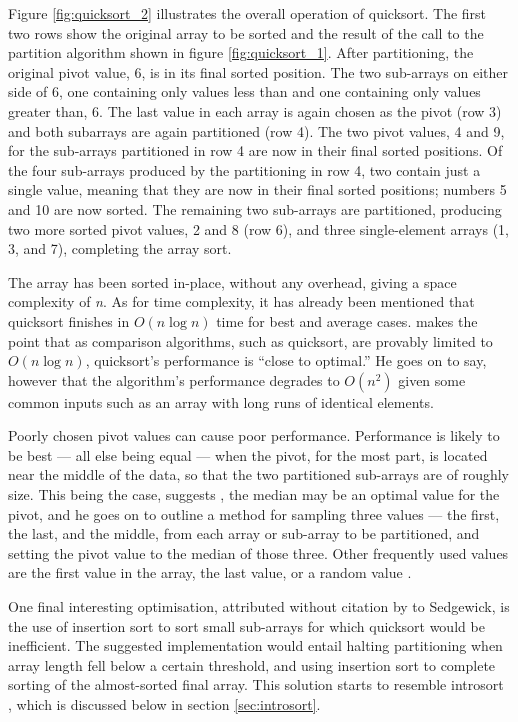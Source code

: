 \documentclass[12pt, a4paper]{article}
\begin{document}
Figure \ref{fig:quicksort_2} illustrates the overall operation of quicksort. The first two rows show the original array to be sorted and the result of the call to the partition algorithm shown in figure \ref{fig:quicksort_1}. After partitioning, the original pivot value, 6, is in its final sorted position. The two sub-arrays on either side of 6, one containing only values less than and one containing only values greater than, 6. The last value in each array is again chosen as the pivot (row 3) and both subarrays are again partitioned (row 4). The two pivot values, 4 and 9, for the sub-arrays partitioned in row 4 are now in their final sorted positions. Of the four sub-arrays produced by the partitioning in row 4, two contain just a single value, meaning that they are now in their final sorted positions; numbers 5 and 10 are now sorted. The remaining two sub-arrays are partitioned, producing two more sorted pivot values, 2 and 8 (row 6), and three single-element arrays (1, 3, and 7), completing the array sort. 

The array has been sorted in-place, without any overhead, giving a space complexity of \emph{n}. As for time complexity, it has already been mentioned that quicksort finishes in $O(n\log n)$ time for best and average cases. \textcite[119]{bentley:pearls} makes the point that as comparison algorithms, such as quicksort, are provably limited to $O(n\log n)$, quicksort's performance is ``close to optimal.''  He goes on to say, however that the algorithm's performance degrades to $O(n^{2})$ given some common inputs such as an array with long runs of identical elements.

Poorly chosen pivot values can cause poor performance. Performance is likely to be best — all else being equal — when the pivot, for the most part, is located near the middle of the data, so that the two partitioned sub-arrays are of roughly size. This being the case, suggests \textcite[851]{Sedgewick-1978}, the median may be an optimal value for the pivot, and he goes on to outline a method for sampling three values — the first, the last, and the middle, from each array or sub-array to be partitioned, and setting the pivot value to the median of those three. Other frequently used values are the first value in the array, the last value, or a random value \autocite*[73]{heineman2016algorithms}.

One final interesting optimisation, attributed without citation by \textcite[121]{bentley:pearls} to Sedgewick, is the use of insertion sort to sort small sub-arrays for which quicksort would be inefficient. The suggested implementation would entail halting partitioning when array length fell below a certain threshold, and using insertion sort to complete sorting of the almost-sorted final array. This solution starts to resemble introsort \autocite{musser1997}, which is discussed below in section \ref{sec:introsort}.
\end{document}
